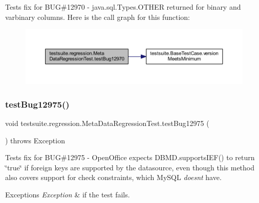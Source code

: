Tests fix for B\+UG\#12970 -\/ java.\+sql.\+Types.\+O\+T\+H\+ER returned for binary and varbinary columns. Here is the call graph for this function\+:
\nopagebreak
\begin{figure}[H]
\begin{center}
\leavevmode
\includegraphics[width=350pt]{classtestsuite_1_1regression_1_1_meta_data_regression_test_a90992a3b409d173b89d677edbc407433_cgraph}
\end{center}
\end{figure}
\mbox{\label{classtestsuite_1_1regression_1_1_meta_data_regression_test_ad4507d03539b3dcb6640da83424031e7}} 
\subsubsection{\texorpdfstring{test\+Bug12975()}{testBug12975()}}
{\footnotesize\ttfamily void testsuite.\+regression.\+Meta\+Data\+Regression\+Test.\+test\+Bug12975 (\begin{DoxyParamCaption}{ }\end{DoxyParamCaption}) throws Exception}

Tests fix for B\+UG\#12975 -\/ Open\+Office expects D\+B\+M\+D.\+supports\+I\+E\+F() to return \char`\"{}true\char`\"{} if foreign keys are supported by the datasource, even though this method also covers support for check constraints, which My\+S\+QL {\itshape doesn\textquotesingle{}t} have.


\begin{DoxyExceptions}{Exceptions}
{\em Exception} & if the test fails. \\
\hline
\end{DoxyExceptions}
\mbox{\label{classtestsuite_1_1regression_1_1_meta_data_regression_test_a0c675c284ad20892d31732b73f09e7c6}} 
